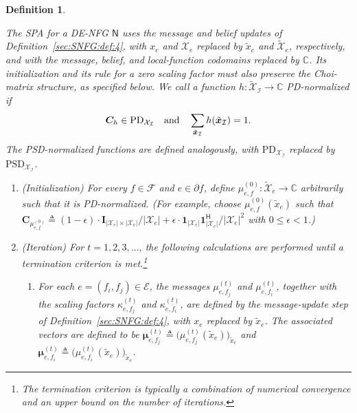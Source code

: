 \documentclass[journal]{IEEEtran}
\newcommand{\add}[1]{{\color{black}#1}}
\newtheorem{definition}[theorem]{Definition}
\newcommand{\vect}[1]{ \bm{#1} }
\newcommand{\set}[1]{\mathcal{#1}}
\newcommand{\setEfull}{ \mathcal{E} }
\newcommand{\setF}{ \mathcal{F} }
\newcommand{\sfN}{ \mathsf{N} }
\newcommand{\setpf}{ \partial f }
\newcommand{\sC}{\mathbb{C}}
\newcommand{\Herm}{\mathsf{H}}
\newcommand{\xe}{ x_{e} }
\newcommand{\setxe}{ \mathcal{X}_{e} }
\newcommand{\vmu}{ \vect{ \mu } }
\newcommand{\defeq}{ \triangleq }
\newcommand{\setPSD}[1]{ \mathrm{PSD}_{#1} }
\newcommand{\setPD}[1]{ \mathrm{PD}_{#1} }
\newcommand{\tset}[1]{\tilde{\mathcal{#1}}}
\newcommand{\matr}[1]{\vect{#1}}
\newcommand{\ef}{ e,f }
\newcommand{\efi}{ e,f_i }
\newcommand{\efj}{ e,f_j }
\newcommand{\txe}{ \tilde{x}_{e} }
\newcommand{\tvx}{ \tilde{\vect{x}}  }
\begin{document}
\begin{definition}\label{sec:DENFG:def:2}

  \add{The SPA for a DE-NFG $\sfN$ uses the message and belief updates of
    Definition~\ref{sec:SNFG:def:4}, with $\xe$ and $\setxe$ replaced by
    $\txe$ and $\tset{X}_e$, respectively, and with the message, belief, and
    local-function codomains replaced by $\sC$. Its initialization and its
    rule for a zero scaling factor must also preserve the Choi-matrix
    structure, as specified below. We call a function
    $h:\tset{X}_{\set{I}}\to\sC$ \emph{PD-normalized} if}
  \begin{align*}
    \add{\matr{C}_h\in\setPD{\set{X}_{\set{I}}}
      \quad\text{and}\quad
      \sum_{\tvx_{\set{I}}}h(\tvx_{\set{I}})=1.}
  \end{align*}
  \add{
    The \emph{PSD-normalized} functions are defined analogously, with $\setPD{\set{X}_{\set{I}}}$ replaced by $\setPSD{\set{X}_{\set{I}}}$.}
  \begin{enumerate}
    \item (Initialization) \add{For every $f \in \setF$ and $e \in \setpf$,
            define $\mu_{\ef}^{(0)}: \tset{X}_e \to \sC$ arbitrarily such that it is
            PD-normalized. (For example, choose $\mu_{\ef}^{(0)}(\txe)$ such that
            $\matr{C}_{\mu_{\ef}^{(0)}} \defeq (1 \! - \! \epsilon) \cdot
              \matr{I}_{|\set{X}_e| \times |\set{X}_e|} / |\set{X}_e| + \epsilon \cdot
              \bm{1}_{|\set{X}_e|} \bm{1}_{|\set{X}_e|}^{\Herm} / |\set{X}_e|^2$ with
            $0 \leq \epsilon < 1$.)}

    \item\label{details of SPA in DE-NFG} (Iteration) For $t = 1, 2, 3, \ldots$,
          the following calculations are performed until a termination criterion is
          met.\footnote{The termination criterion is typically a combination of
            numerical convergence and an upper bound on the number of iterations.}
          \begin{enumerate}

            \item
                  \label{SPA: update message: DE-NFG}

                  \add{For each $ e = (f_{i},f_{j}) \in \setEfull $, the messages $\mu_{\efj}^{(t)}$ and $\mu_{\efi}^{(t)}$, together with the scaling factors $\kappa_{\efj}^{(t)}$ and $\kappa_{\efi}^{(t)}$, are defined by the message-update step of Definition~\ref{sec:SNFG:def:4}, with $\xe$ replaced by $\txe$.}
                  The associated vectors are defined to be
                  $ \vmu_{\efj}^{(t)} \defeq \bigl( \mu_{\efj}^{(t)}(\txe) \bigr)_{ \!  \txe } $
                  and $ \vmu_{\efi}^{(t)} \defeq \bigl( \mu_{\efi}^{(t)}(\txe) \bigr)_{ \!  \txe } $.


\end{enumerate}
\end{enumerate}
\end{definition}
\end{document}

